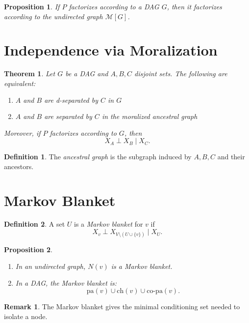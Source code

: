 \documentclass[12pt,oneside]{book}
\numberwithin{equation}{section}
\theoremstyle{definition}
\newtheorem{definition}{Definition}[section]
\newtheorem{remark}{Remark}[section]
\theoremstyle{plain}
\newtheorem{theorem}{Theorem}[section]
\newtheorem{proposition}{Proposition}[section]
\theoremstyle{remark}
\begin{document}
\begin{proposition}
If $P$ factorizes according to a DAG $G$, then it factorizes according to the undirected graph $\mathcal{M}[G]$.
\end{proposition}


\section{Independence via Moralization}

\begin{theorem}
Let $G$ be a DAG and $A,B,C$ disjoint sets. The following are equivalent:

\begin{enumerate}
\item $A$ and $B$ are d-separated by $C$ in $G$
\item $A$ and $B$ are separated by $C$ in the moralized ancestral graph
\end{enumerate}

Moreover, if $P$ factorizes according to $G$, then
\[
X_A \perp X_B \mid X_C.
\]
\end{theorem}

\begin{definition}
The \emph{ancestral graph} is the subgraph induced by $A,B,C$ and their ancestors.
\end{definition}


\section{Markov Blanket}

\begin{definition}
A set $U$ is a \emph{Markov blanket} for $v$ if
\[
X_v \perp X_{V \setminus (U \cup \{v\})} \mid X_U.
\]
\end{definition}

\begin{proposition}
\begin{enumerate}
\item In an undirected graph, $N(v)$ is a Markov blanket.
\item In a DAG, the Markov blanket is:
\[
\mathrm{pa}(v) \cup \mathrm{ch}(v) \cup \mathrm{co\text{-}pa}(v).
\]
\end{enumerate}
\end{proposition}

\begin{remark}
The Markov blanket gives the minimal conditioning set needed to isolate a node.
\end{remark}
\end{document}
